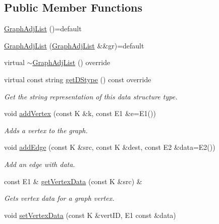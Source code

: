 \subsection*{Public Member Functions}
\begin{DoxyCompactItemize}
\item 
\hyperlink{classbridges_1_1datastructure_1_1_graph_adj_list_adb181bcfe104b8df8b3218ccf1b67ea5}{Graph\+Adj\+List} ()=default
\item 
\hyperlink{classbridges_1_1datastructure_1_1_graph_adj_list_ac175167a4447f3fc9c7f3e72f2f6a0b1}{Graph\+Adj\+List} (\hyperlink{classbridges_1_1datastructure_1_1_graph_adj_list}{Graph\+Adj\+List} \&\&gr)=default
\item 
virtual \hyperlink{classbridges_1_1datastructure_1_1_graph_adj_list_a17413dc27d7e60e1aa31cafa32082d12}{$\sim$\+Graph\+Adj\+List} () override
\item 
virtual const string \hyperlink{classbridges_1_1datastructure_1_1_graph_adj_list_adf1bfde5ec7192f3ee334695059f8fa6}{get\+D\+Stype} () const override
\begin{DoxyCompactList}\small\item\em Get the string representation of this data structure type. \end{DoxyCompactList}\item 
void \hyperlink{classbridges_1_1datastructure_1_1_graph_adj_list_a3bde76e49be4330da895103475f8430b}{add\+Vertex} (const K \&k, const E1 \&e=E1())
\begin{DoxyCompactList}\small\item\em Adds a vertex to the graph. \end{DoxyCompactList}\item 
void \hyperlink{classbridges_1_1datastructure_1_1_graph_adj_list_a6573cc104657315196404bcef481d890}{add\+Edge} (const K \&src, const K \&dest, const E2 \&data=E2())
\begin{DoxyCompactList}\small\item\em Add an edge with data. \end{DoxyCompactList}\item 
const E1 \& \hyperlink{classbridges_1_1datastructure_1_1_graph_adj_list_a3a9d3875e7f6eb0d4c3500c53957b9c1}{get\+Vertex\+Data} (const K \&src) \&
\begin{DoxyCompactList}\small\item\em Gets vertex data for a graph vertex. \end{DoxyCompactList}\item 
void \hyperlink{classbridges_1_1datastructure_1_1_graph_adj_list_ab87a30e6cbaf1d2db95dce705ebdd20f}{set\+Vertex\+Data} (const K \&vert\+ID, E1 const \&data)

\end{DoxyCompactItemize}
